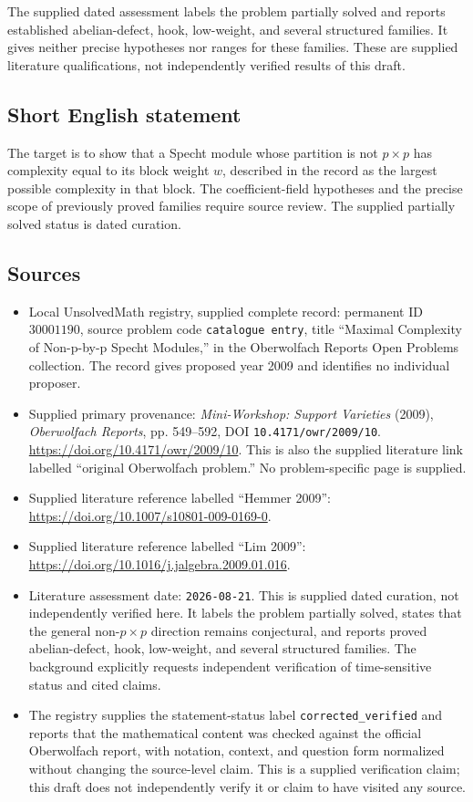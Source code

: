\documentclass[11pt]{article}
\begin{document}
The supplied dated assessment labels the problem partially solved and reports established abelian-defect, hook, low-weight, and several structured families. It gives neither precise hypotheses nor ranges for these families. These are supplied literature qualifications, not independently verified results of this draft.
\subsection{Short English statement}
The target is to show that a Specht module whose partition is not \(p\times p\) has complexity equal to its block weight \(w\), described in the record as the largest possible complexity in that block. The coefficient-field hypotheses and the precise scope of previously proved families require source review. The supplied partially solved status is dated curation.
\subsection{Sources}
\begin{itemize}
\item Local UnsolvedMath registry, supplied complete record: permanent ID \(30001190\), source problem code \texttt{catalogue entry}, title ``Maximal Complexity of Non-p-by-p Specht Modules,'' in the Oberwolfach Reports Open Problems collection. The record gives proposed year 2009 and identifies no individual proposer.
\item Supplied primary provenance: \emph{Mini-Workshop: Support Varieties} (2009), \emph{Oberwolfach Reports}, pp. 549--592, DOI \texttt{10.4171/owr/2009/10}. \url{https://doi.org/10.4171/owr/2009/10}. This is also the supplied literature link labelled ``original Oberwolfach problem.'' No problem-specific page is supplied.
\item Supplied literature reference labelled ``Hemmer 2009'': \url{https://doi.org/10.1007/s10801-009-0169-0}.
\item Supplied literature reference labelled ``Lim 2009'': \url{https://doi.org/10.1016/j.jalgebra.2009.01.016}.
\item Literature assessment date: \texttt{2026-08-21}. This is supplied dated curation, not independently verified here. It labels the problem partially solved, states that the general non-\(p\times p\) direction remains conjectural, and reports proved abelian-defect, hook, low-weight, and several structured families. The background explicitly requests independent verification of time-sensitive status and cited claims.
\item The registry supplies the statement-status label \texttt{corrected\_verified} and reports that the mathematical content was checked against the official Oberwolfach report, with notation, context, and question form normalized without changing the source-level claim. This is a supplied verification claim; this draft does not independently verify it or claim to have visited any source.
\end{itemize}
\end{document}
